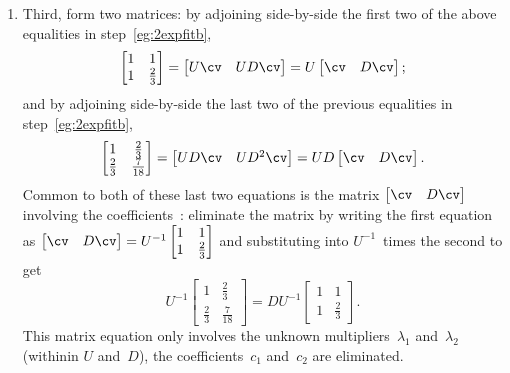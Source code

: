 \begin{example}
\begin{solution}
\begin{enumerate}
\item \label{eg:2expfitc}
Third, form two matrices: by adjoining side-by-side the first two of the above equalities in step~\ref{eg:2expfitb},
\begin{equation*}
\begin{bmatrix} 1&1\\1&\tfrac23 \end{bmatrix}
=\begin{bmatrix} U\cv& UD\cv \end{bmatrix}
=U\begin{bmatrix} \cv&D\cv \end{bmatrix};
\end{equation*}
and by adjoining side-by-side the last two of the previous equalities in step~\ref{eg:2expfitb}, 
\begin{equation*}
\begin{bmatrix} 1&\tfrac23\\\tfrac23&\frac7{18} \end{bmatrix}
=\begin{bmatrix} UD\cv&UD^2\cv \end{bmatrix}
=UD\begin{bmatrix} \cv&D\cv \end{bmatrix}.
\end{equation*}
Common to both of these last two equations is the matrix \(\begin{bmatrix} \cv&D\cv \end{bmatrix}\) involving the coefficients~\cv: eliminate the matrix by writing the first equation as \(\begin{bmatrix} \cv&D\cv \end{bmatrix}=U^{-1}\begin{bmatrix} 1&1\\1&\tfrac23 \end{bmatrix}\) and substituting into \(U^{-1}\)~times the second to get 
\begin{equation*}
U^{-1}\begin{bmatrix} 1&\tfrac23\\\tfrac23&\frac7{18} \end{bmatrix}
=DU^{-1}\begin{bmatrix} 1&1\\1&\tfrac23 \end{bmatrix}.
\end{equation*}
This matrix equation only involves the unknown multipliers~\(\lambda_1\) and~\(\lambda_2\)  (withinin \(U\) and~\(D\)), the coefficients~\(c_1\) and~\(c_2\) are eliminated.


\end{enumerate}
\end{solution}
\end{example}
